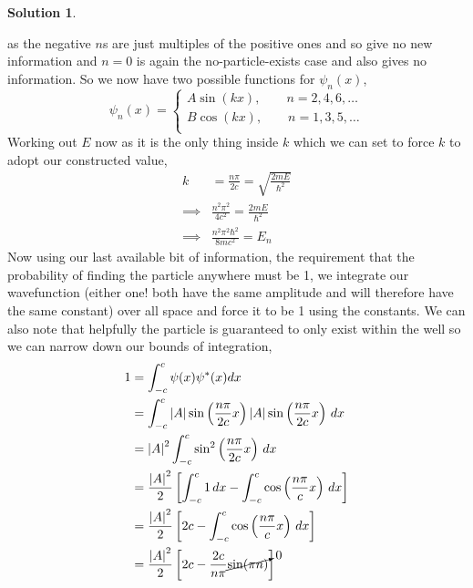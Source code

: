 \documentclass[10pt]{article}
\theoremstyle{definition}
\newtheorem{soln}{Solution}
\begin{document}
\begin{soln}
\begin{enumerate}[label=(\alph*)]
          as the negative $n$s are just multiples of the positive ones and so give no new information and $n=0$ is again the no-particle-exists case
          and also gives no information. So we now have two possible functions for $\psi_n(x)$,
          $$
            \psi_n(x) =
            \begin{cases}
              A\sin(kx),\qquad n=2,4,6,\dots \\
              B\cos(kx),\qquad n=1,3,5,\dots \\
            \end{cases}
          $$
          Working out $E$ now as it is the only thing inside $k$ which we can set to force $k$ to adopt our constructed value,
          \begin{align*}
            k        & =\frac{n\pi}{2c}=\sqrt{\frac{2mE}{\hbar^2}} \\
            \implies & \frac{n^2\pi^2}{4c^2}=\frac{2mE}{\hbar^2}   \\
            \implies & \frac{n^2\pi^2\hbar^2}{8mc^2}=E_n
          \end{align*}
          Now using our last available bit of information, the requirement that the probability of finding the particle anywhere must be 1,
          we integrate our wavefunction (either one! both have the same amplitude and will therefore have the same constant) over all space and force it to be 1 using the constants.
          We can also note that helpfully the particle is guaranteed to only exist within the well so we can narrow down our bounds of integration,
          \begin{align*}
            1 & =\int_{-c}^{c}\psi(x)\psi^*(x)dx                                                                                 \\
              & =\int_{-c}^{c}\left|A\right|\sin\left(\frac{n\pi}{2c}x\right)\left|A\right|\sin\left(\frac{n\pi}{2c}x\right)\,dx \\
              & =\left|A\right|^2\int_{-c}^{c}\sin^2\left(\frac{n\pi}{2c}x\right)\,dx                                            \\
              & =\frac{\left|A\right|^2}{2}\left[\int_{-c}^{c}1\,dx-\int_{-c}^{c}\cos\left(\frac{n\pi}{c}x\right)\,dx\right]     \\
              & =\frac{\left|A\right|^2}{2}\left[2c-\int_{-c}^{c}\cos\left(\frac{n\pi}{c}x\right)\,dx\right]                     \\
              & =\frac{\left|A\right|^2}{2}\left[2c-\frac{2c}{n\pi}\cancelto{0}{\sin(\pi n)}\right]

\end{align*}
\end{enumerate}
\end{soln}
\end{document}
